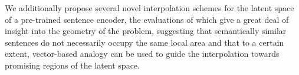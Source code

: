 \documentclass[12pt,a4paper]{article}
\begin{document}
We additionally propose several novel interpolation schemes for the latent space of a pre-trained sentence encoder, the evaluations of which give a great deal of insight into the geometry of the problem, suggesting that semantically similar sentences do not necessarily occupy the same local area and that to a certain extent, vector-based analogy can be used to guide the interpolation towards promising regions of the latent space.

\clearpage


\end{document}
